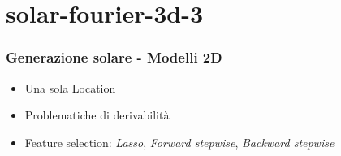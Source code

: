 \documentclass{beamer}
\begin{document}
\section{solar-fourier-3d-3}
\begin{frame}
    \frametitle{Generazione solare - Modelli 2D}   
    \begin{itemize}
        \item<1-> Una sola Location
        \item<2-> Problematiche di derivabilità
        \item<3-> Feature selection:
        \textit{Lasso}, 
        \textit{Forward stepwise}, 
        \textit{Backward stepwise}
    \end{itemize}
    
    \begin{overlayarea}{\textwidth}{\textheight}
        \vfill
        \centering
    \end{overlayarea}
\end{frame}
\end{document}
